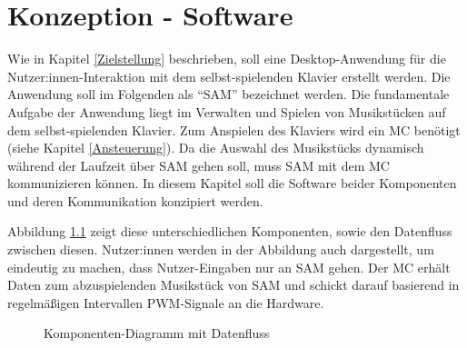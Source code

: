 
\nocite{*}
\chapter{Konzeption - Software} \label{vorgehenSW}


Wie in Kapitel \ref{Zielstellung} beschrieben, soll eine Desktop-Anwendung für die Nutzer:innen-Interaktion mit dem selbst-spielenden Klavier erstellt werden.
Die Anwendung soll im Folgenden als \enquote{\ac{SAM}} bezeichnet werden.
Die fundamentale Aufgabe der Anwendung liegt im Verwalten und Spielen von Musikstücken auf dem selbst-spielenden Klavier.
Zum Anspielen des Klaviers wird ein \ac{MC} benötigt (siehe Kapitel \ref{Ansteuerung}).
Da die Auswahl des Musikstücks dynamisch während der Laufzeit über \ac{SAM} gehen soll, muss \ac{SAM} mit dem \ac{MC} kommunizieren können.
In diesem Kapitel soll die Software beider Komponenten und deren Kommunikation konzipiert werden.

Abbildung \ref*{fig:high-level-komponenten} zeigt diese unterschiedlichen Komponenten, sowie den Datenfluss zwischen diesen.
Nutzer:innen werden in der Abbildung auch dargestellt, um eindeutig zu machen, dass Nutzer-Eingaben nur an \ac{SAM} gehen.
Der \ac{MC} erhält Daten zum abzuspielenden Musikstück von \ac{SAM} und schickt darauf basierend in regelmäßigen Intervallen \ac{PWM}-Signale an die Hardware.

\begin{figure}[htbp]
    \centering
    \caption{Komponenten-Diagramm mit Datenfluss}
    \label{fig:high-level-komponenten}
\end{figure}

